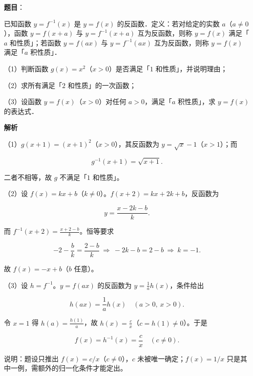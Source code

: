\begin{answer}

\textbf{题目}：

已知函数 $y=f^{-1}(x)$ 是 $y=f(x)$ 的反函数．定义：若对给定的实数 $a$（$a\neq0$），函数 $y=f(x+a)$ 与 $y=f^{-1}(x+a)$ 互为反函数，则称 $y=f(x)$ 满足「$a$ 和性质」；若函数 $y=f(ax)$ 与 $y=f^{-1}(ax)$ 互为反函数，则称 $y=f(x)$ 满足「$a$ 积性质」．

（1）判断函数 $g(x)=x^2$（$x>0$）是否满足「$1$ 和性质」，并说明理由；

（2）求所有满足「$2$ 和性质」的一次函数；

（3）设函数 $y=f(x)$（$x>0$）对任何 $a>0$，满足「$a$ 积性质」，求 $y=f(x)$ 的表达式．

\textbf{解析}

（1）$g(x+1)=(x+1)^2$（$x>0$），其反函数为 $y=\sqrt x-1$（$x>1$）；而

\nopagebreak[4]
\[g^{-1}(x+1)=\sqrt{x+1}.\]

二者不相等，故 $g$ 不满足「$1$ 和性质」。

（2）设 $f(x)=kx+b$（$k\neq0$）。$f(x+2)=kx+2k+b$，反函数为

\nopagebreak[4]
\[y=\frac{x-2k-b}{k}.\]

而 $f^{-1}(x+2)=\frac{x+2-b}{k}$。恒等要求

\nopagebreak[4]
\[-2-\frac bk=\frac{2-b}{k}\ \Longrightarrow\ -2k-b=2-b\ \Longrightarrow\ k=-1 .\]

故 $f(x)=-x+b$（$b$ 任意）。

（3）设 $h=f^{-1}$。$y=f(ax)$ 的反函数为 $y=\frac1a h(x)$，条件给出

\nopagebreak[4]
\[h(ax)=\frac1a h(x)\quad(a>0,\ x>0).\]

令 $x=1$ 得 $h(a)=\frac{h(1)}{a}$，故 $h(x)=\frac cx$（$c=h(1)\neq0$）。于是

\nopagebreak[4]
\[f(x)=h^{-1}(x)=\frac cx\quad(c\neq0).\]

\begin{gktip}
说明：题设只推出 $f(x)=c/x$（$c\neq0$），$c$ 未被唯一确定；$f(x)=1/x$ 只是其中一例，需额外的归一化条件才能定出。
\end{gktip}


\end{answer}
